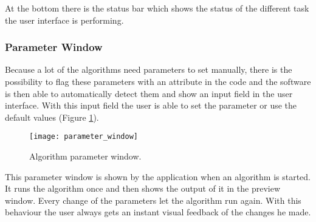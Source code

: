 At the bottom there is the status bar which shows the status of the different task the user interface is performing.


\subsubsection{Parameter Window} \label{sub:parameter_window}
Because a lot of the algorithms need parameters to set manually, there is the possibility to flag these parameters with an attribute in the code and the software is then able to automatically detect them and show an input field in the user interface. With this input field the user is able to set the parameter or use the default values (Figure \ref{fig:parameter_window}).


\begin{figure}[h!]
  \centering
      \texttt{[image: parameter\_window]}
  \caption{Algorithm parameter window.}
  \label{fig:parameter_window}
\end{figure}

This parameter window is shown by the application when an algorithm is started. It runs the algorithm once and then shows the output of it in the preview window. Every change of the parameters let the algorithm run again. With this behaviour the user always gets an instant visual feedback of the changes he made.

